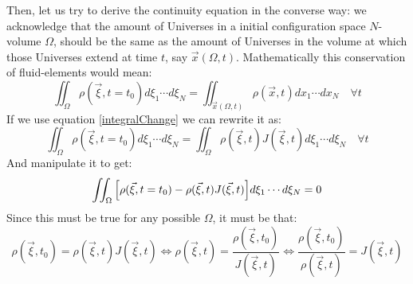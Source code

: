 \documentclass[11pt, a4paper]{article} %
\begin{document}
{Then, let us try to derive the continuity equation in the converse way: we acknowledge that the amount of Universes in a initial configuration space $N$-volume $\Omega$, should be the same as the amount of Universes in the volume at which those Universes extend at time $t$, say $\vec{x}(\Omega,t)$. Mathematically this conservation of fluid-elements would mean:
\begin{equation}
\iint_\Omega \rho(\vec{\xi},t=t_0) d\xi_1\cdots d\xi_N=\iint_{\vec{x}(\Omega,t)} \rho(\vec{x},t) dx_1\cdots dx_N\quad \forall t
\end{equation}
If we use equation \eqref{integralChange} we can rewrite it as:
\begin{equation}
\iint_\Omega \rho(\vec{\xi},t=t_0) d\xi_1\cdots d\xi_N=\iint_{\Omega} \rho(\vec{\xi},t) J(\vec{\xi},t) d\xi_1\cdots d\xi_N \quad \forall t
\end{equation}
And manipulate it to get:
\begin{equation}
\iint_\Omega \qty[ \rho(\vec{\xi},t=t_0) -\rho(\vec{\xi},t) J(\vec{\xi},t) ]d\xi_1\cdots d\xi_N=0
\end{equation}
Since this must be true for any possible $\Omega$, it must be that:
\begin{equation}
\rho(\vec{\xi},t_0) = \rho(\vec{\xi},t) J(\vec{\xi},t)\Longleftrightarrow \rho(\vec{\xi},t)=\frac{\rho(\vec{\xi},t_0)}{J(\vec{\xi},t)}\Longleftrightarrow \frac{\rho(\vec{\xi},t_0)}{\rho(\vec{\xi},t)}=J(\vec{\xi},t)
\end{equation}
}
\end{document}
